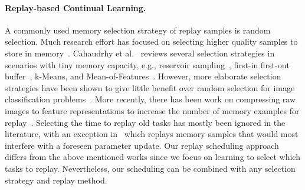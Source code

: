 \paragraph{Replay-based Continual Learning.} A commonly used memory selection strategy of replay samples is random selection. 
Much research effort has focused on selecting higher quality samples to store in memory~. Cahaudrhy et al.~ reviews several selection strategies in scenarios with tiny memory capacity, e.g., reservoir sampling~, first-in first-out buffer~, k-Means, and Mean-of-Features~. However, more elaborate selection strategies have been shown to give little benefit over random selection for image classification problems~. More recently, there has been work on compressing raw images to feature representations to increase the number of memory examples for replay~. 
Selecting the time to replay old tasks has mostly been ignored in the literature, with an exception in~ which replays memory samples that would most interfere with a foreseen parameter update. 
Our replay scheduling approach differs from the above mentioned works since we focus on learning to select which tasks to replay. Nevertheless, our scheduling can be combined with any selection strategy and replay method. 


\vspace{-3mm}
